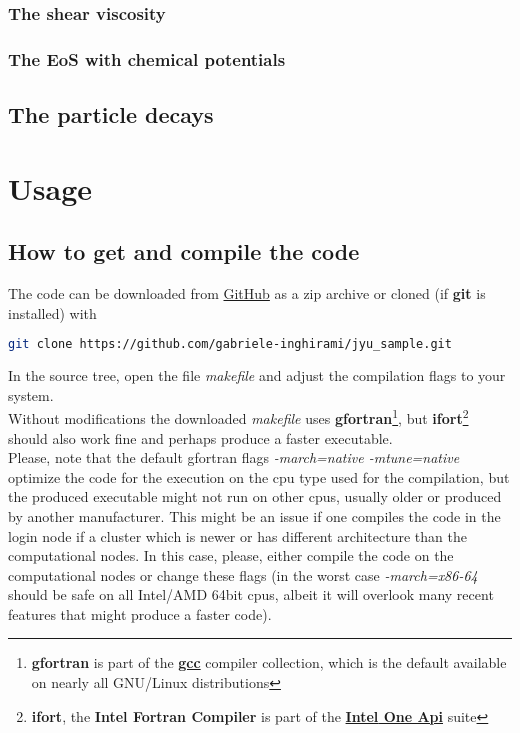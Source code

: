 \documentclass[12pt, a4paper]{report}
\begin{document}
	\subsection{The shear viscosity}
	\subsection{The EoS with chemical potentials}	
	\section{The particle decays}
    
\chapter{Usage}
\section{How to get and compile the code}
The code can be downloaded from \href{https://github.com/gabriele-inghirami/jyu_sample}{GitHub} as a zip archive or cloned (if \textbf{git} is installed) with
\begin{lstlisting}[language=bash]
  git clone https://github.com/gabriele-inghirami/jyu_sample.git
\end{lstlisting}
In the source tree, open the file \emph{makefile} and adjust the compilation flags to your system.\\
Without modifications the downloaded \emph{makefile} uses \textbf{gfortran}\footnote{\textbf{gfortran} is part of the \textbf{\href{https://gcc.gnu.org/}{gcc}} compiler collection, which is the default available on nearly all GNU/Linux distributions}, but \textbf{ifort}\footnote{\textbf{ifort}, the \textbf{Intel\textsuperscript{\textregistered} Fortran Compiler} is part of the \textbf{\href{https://www.intel.com/content/www/us/en/developer/tools/oneapi/fortran-compiler.html}{Intel\textsuperscript{\textregistered} One Api}} suite} should also work fine and perhaps produce a faster executable.\\
Please, note that the default gfortran flags \emph{-march=native -mtune=native} optimize the code for the execution on the cpu type used for the compilation, but the produced executable might not run on other cpus, usually older or produced by another manufacturer. This might be an issue if one compiles the code in the login node if a cluster which is newer or has different architecture than the computational nodes. In this case, please, either compile the code on the computational nodes or change these flags (in the worst case \emph{-march=x86-64} should be safe on all Intel/AMD 64bit cpus, albeit it will overlook many recent features that might produce a faster code).
\end{document}
